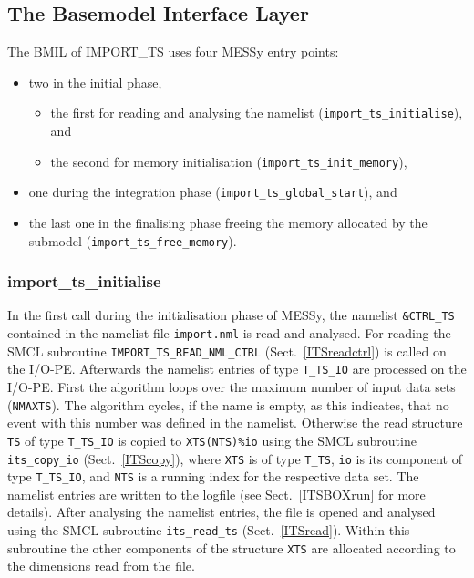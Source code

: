 \documentclass[11pt,twoside]{report}
\begin{document}
\subsection{The Basemodel Interface Layer}
The BMIL of IMPORT\_TS uses four MESSy entry points:
\begin{itemize}
\item  two in the initial phase, 
\begin{itemize} 
\item the first for reading and analysing the namelist (\verb|import_ts_initialise|), and
\item the second for memory initialisation (\verb|import_ts_init_memory|),
\end{itemize}
\item one during the integration phase (\verb|import_ts_global_start|), and 
\item the last one in the finalising phase freeing the memory allocated by
 the submodel (\verb|import_ts_free_memory|).
\end{itemize}

\subsubsection{import\_ts\_initialise}
In the first call during the initialisation phase of MESSy, the namelist
\verb|&CTRL_TS| contained in the namelist file \verb|import.nml| is read
and analysed.
For reading the SMCL subroutine  \verb|IMPORT_TS_READ_NML_CTRL| (Sect.~\ref{ITSreadctrl}) is called on the I/O-PE.
Afterwards the namelist entries of type \verb|T_TS_IO| are processed on the I/O-PE. First the algorithm loops over the maximum number of input data sets 
(\verb|NMAXTS|). The algorithm cycles, if the name is empty, as this indicates,
that no event with this number was defined in the namelist.
Otherwise the read structure \verb|TS| of type \verb|T_TS_IO| is copied to
\verb|XTS(NTS)%io| using the SMCL subroutine \verb|its_copy_io|
 (Sect.~\ref{ITScopy}), where \verb|XTS| is of type \verb|T_TS|, \verb|io|
is its component of type \verb|T_TS_IO|, and \verb|NTS| is a running index
for the respective data set.
The namelist entries are written to the logfile
(see Sect.~\ref{ITSBOXrun} for more details). After analysing the namelist
entries, the file is opened and analysed using the SMCL subroutine
\verb|its_read_ts| (Sect.~\ref{ITSread}).
Within this subroutine the other components of the structure \verb|XTS| are
allocated according to the dimensions read from the file.
\end{document}
